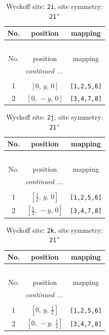 \documentclass[fleqn,8pt]{jsarticle}
\begin{document}
\renewcommand{\arraystretch}{1.2}
\begin{longtable}{ccc}
\caption{Wyckoff site: {\tt 2i}, site symmetry: {\tt 21'}}
 \\
 \hline \hline
No. & position & mapping \\ \hline \endfirsthead

\multicolumn{2}{l}{\tablename\ \thetable{}} \\
 \hline \hline
No. & position & mapping \\ \hline \endhead

 \hline \hline
\multicolumn{2}{r}{\footnotesize\it continued ...} \\ \endfoot

 \hline \hline
\multicolumn{2}{r}{} \\ \endlastfoot

1 & $\left[ 0,\, y,\, 0 \right]$ & {\tt [1,2,5,6]} \\ \hline
2 & $\left[ 0,\, - y,\, 0 \right]$ & {\tt [3,4,7,8]} \\
\end{longtable}
\renewcommand{\arraystretch}{1.2}
\begin{longtable}{ccc}
\caption{Wyckoff site: {\tt 2j}, site symmetry: {\tt 21'}}
 \\
 \hline \hline
No. & position & mapping \\ \hline \endfirsthead

\multicolumn{2}{l}{\tablename\ \thetable{}} \\
 \hline \hline
No. & position & mapping \\ \hline \endhead

 \hline \hline
\multicolumn{2}{r}{\footnotesize\it continued ...} \\ \endfoot

 \hline \hline
\multicolumn{2}{r}{} \\ \endlastfoot

1 & $\left[ \frac{1}{2},\, y,\, 0 \right]$ & {\tt [1,2,5,6]} \\ \hline
2 & $\left[ \frac{1}{2},\, - y,\, 0 \right]$ & {\tt [3,4,7,8]} \\
\end{longtable}
\renewcommand{\arraystretch}{1.2}
\begin{longtable}{ccc}
\caption{Wyckoff site: {\tt 2k}, site symmetry: {\tt 21'}}
 \\
 \hline \hline
No. & position & mapping \\ \hline \endfirsthead

\multicolumn{2}{l}{\tablename\ \thetable{}} \\
 \hline \hline
No. & position & mapping \\ \hline \endhead

 \hline \hline
\multicolumn{2}{r}{\footnotesize\it continued ...} \\ \endfoot

 \hline \hline
\multicolumn{2}{r}{} \\ \endlastfoot

1 & $\left[ 0,\, y,\, \frac{1}{2} \right]$ & {\tt [1,2,5,6]} \\ \hline
2 & $\left[ 0,\, - y,\, \frac{1}{2} \right]$ & {\tt [3,4,7,8]} \\
\end{longtable}
\end{document}
